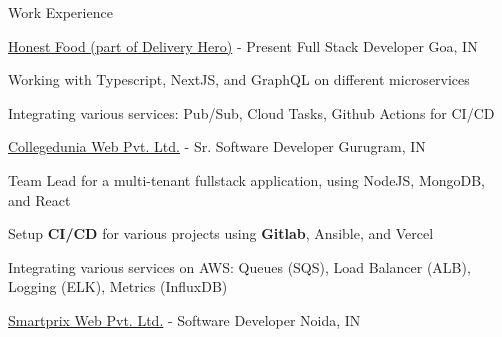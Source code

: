 \documentclass[UKenglish]{resume} %
\begin{document}
\begin{rSection}{Work Experience}
    \begin{rSubsection}
        {\href{https://www.honestfoodcompany.de/}{Honest Food (part of Delivery Hero)}}
        {  - Present }
        {Full Stack Developer}
        {Goa, IN}

        \item Working with Typescript, NextJS, and GraphQL on different microservices
        \item Integrating various services: Pub/Sub, Cloud Tasks, Github Actions for CI/CD

    \end{rSubsection}

    \begin{rSubsection}
        {\href{https://collegedunia.com}{Collegedunia Web Pvt. Ltd.}}
        {  -  }
        {Sr. Software Developer}
        {Gurugram, IN}

        \item Team Lead for a multi-tenant fullstack application, using NodeJS, MongoDB, and React
        \item Setup \textbf{CI/CD} for various projects using \textbf{Gitlab}, Ansible, and Vercel
        \item Integrating various services on AWS: Queues (SQS), Load Balancer (ALB), Logging (ELK), Metrics (InfluxDB)

    \end{rSubsection}

    \begin{rSubsection}
        {\href{https://www.smartprix.com}{Smartprix Web Pvt. Ltd.}}
        {  -  }
        {Software Developer}
        {Noida, IN}


\end{rSubsection}
\end{rSection}
\end{document}
